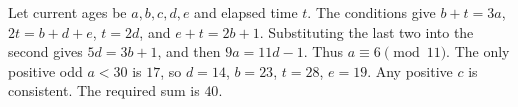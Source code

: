 Let current ages be $a,b,c,d,e$ and elapsed time $t$. The conditions give $b+t=3a$, $2t=b+d+e$, $t=2d$, and $e+t=2b+1$. Substituting the last two into the second gives $5d=3b+1$, and then $9a=11d-1$. Thus $a\equiv6\pmod{11}$. The only positive odd $a<30$ is $17$, so $d=14$, $b=23$, $t=28$, $e=19$. Any positive $c$ is consistent. The required sum is $\boxed{40}$.
